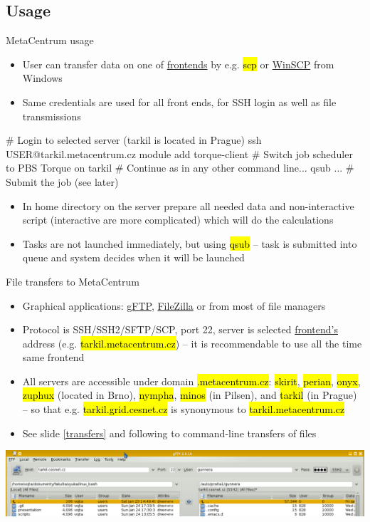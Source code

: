 \documentclass[compress, ucs, xelatex, 11pt, xcolor=svgnames,
  hyperref={
    bookmarks=true,
    unicode=true,
    colorlinks=true,
    pdftitle={Linux, command line and MetaCentrum},
    plainpages=false,
    pdfauthor={Vojtech Zeisek},
    pdfsubject={Course about use of Linux command line, writing shell scripts and using MetaCentrum of CESNET},
    pdfcreator={XeLaTeX},
    pdfkeywords={Linux, GNU, BASH, shell, command line, MetaCentrum},
    linkcolor=DarkRed,
    anchorcolor=DarkBlue,
    citecolor=Indigo,
    filecolor=NavyBlue,
    menucolor=DarkMagenta,
    urlcolor=DarkBlue,
    pdftex},
  url={hyphens, lowtilde} %
  ]{beamer}
\renewcommand{\texttt}[1]{\hl{\ttfamily #1}}
\begin{document}
\subsection{Usage}

\begin{frame}[fragile]{MetaCentrum usage}
  \begin{itemize}
    \item User can transfer data on one of \href{https://wiki.metacentrum.cz/wiki/Frontend}{frontends} by e.g. \texttt{scp} or \href{https://winscp.net/}{WinSCP} from Windows
    \item Same credentials are used for all front ends, for SSH login as well as file transmissions
  \end{itemize}
  \begin{bashcode}
    # Login to selected server (tarkil is located in Prague)
    ssh USER@tarkil.metacentrum.cz
    module add torque-client # Switch job scheduler to PBS Torque on tarkil
    # Continue as in any other command line...
    qsub ... # Submit the job (see later)
  \end{bashcode}
  \begin{itemize}
    \item In home directory on the server prepare all needed data and non-interactive script (interactive are more complicated) which will do the calculations
    \item Tasks are not launched immediately, but using \texttt{qsub} -- task is submitted into queue and system decides when it will be launched
  \end{itemize}
\end{frame}

\begin{frame}{File transfers to MetaCentrum}
  \begin{itemize}
    \item Graphical applications: \href{http://gftp.org/}{gFTP}, \href{https://filezilla-project.org/}{FileZilla} or from most of file managers
    \item Protocol is SSH/SSH2/SFTP/SCP, port 22, server is selected \href{https://wiki.metacentrum.cz/wiki/Frontend}{frontend's} address (e.g. \texttt{tarkil.metacentrum.cz}) -- it is recommendable to use all the time same frontend
    \item All servers are accessible under domain \texttt{*.metacentrum.cz}: \texttt{skirit}, \texttt{perian}, \texttt{onyx}, \texttt{zuphux} (located in Brno), \texttt{nympha}, \texttt{minos} (in Pilsen), and \texttt{tarkil} (in Prague) -- so that e.g. \texttt{tarkil.grid.cesnet.cz} is synonymous to \texttt{tarkil.metacentrum.cz}
    \item See slide \ref{transfers} and following to command-line transfers of files
  \end{itemize}
  \includegraphics[width=\textwidth]{gftp.png}
\end{frame}
\end{document}
